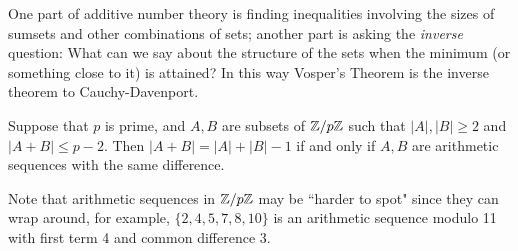 One part of additive number theory is finding inequalities involving the sizes of sumsets and other combinations of sets; another part is asking the {\it inverse} question: What can we say about the structure of the sets when the minimum (or something close to it) is attained? In this way Vosper's Theorem is the inverse theorem to Cauchy-Davenport.
\begin{thm}[Vosper]
Suppose that $p$ is prime, and $A,B$ are subsets of $\mathbb{Z}/p\mathbb{Z}$ such that $|A|,|B|\geq 2$ and $|A+B|\leq p-2$. Then $|A+B|=|A|+|B|-1$ if and only if $A,B$ are arithmetic sequences with the same difference.
\end{thm}
Note that arithmetic sequences in $\mathbb{Z}/p\mathbb{Z}$ may be ``harder to spot" since they can wrap around, for example, $\{2,4,5,7,8,10\}$ is an arithmetic sequence modulo 11 with first term 4 and common difference 3.

